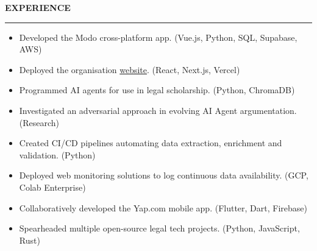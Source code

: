\documentclass[11pt, letterpaper]{article}
\newcommand\sectionTitle[1]{%
    \begingroup
        \textbf{\MakeUppercase{#1}}
        \vspace{0.4em}
        \hrule
        \vspace{-0.3em}
    \endgroup
}%
\newenvironment{experienceSection}[1]{%
    \sectionTitle{#1}%
    \begin{list}{}{ %
        \setlength{\leftmargin}{0em} %
    }%
        \item[]%
    }{%
    \end{list}%
}%
\begin{document}
\begin{experienceSection}{Experience}

    \experienceItem[
        company={The Modo Collective},
        location={Singapore},
        position={Founder \& Lead Developer},
        duration={Jan. 2025 - Aug. 2025}
    ]
    \begin{itemize}
        \setlength{\itemsep}{-6pt}
        \item Developed the Modo cross-platform app. (Vue.js, Python, SQL, Supabase, AWS)
        \item Deployed the organisation \href{https://modo-com.vercel.app/}{website}. (React, Next.js, Vercel)
    \end{itemize}

    \experienceItem[
        company={SMU Yong Pung How School of Law},
        location={Singapore},
        position={Research Assistant},
        duration={Jan. 2025 - Apr. 2025}
    ]
    \begin{itemize}
        \setlength{\itemsep}{-6pt}
        \item Programmed AI agents for use in legal scholarship. (Python, ChromaDB)
        \item Investigated an adversarial approach in evolving AI Agent argumentation. (Research)
    \end{itemize}

    \experienceItem[
        company={Elefant},
        location={Singapore},
        position={Backend Development Intern},
        duration={Sep. 2024 - Dec. 2024}
    ]
    \begin{itemize}
        \setlength{\itemsep}{-6pt}
        \item Created CI/CD pipelines automating data extraction, enrichment and validation. (Python)
        \item Deployed web monitoring solutions to log continuous data availability. (GCP, Colab Enterprise)
    \end{itemize}

    \experienceItem[
        company={The Yap Labs},
        location={Singapore},
        position={Co-founder \& Tech Development Head},
        duration={Apr. 2024 - Aug. 2024}
    ]
    \begin{itemize}
        \setlength{\itemsep}{-6pt}
        \item Collaboratively developed the Yap.com mobile app. (Flutter, Dart, Firebase)
    \end{itemize}

    \experienceItem[
        company={SMU Legal Innovation and Technology (LIT)},
        location={Singapore},
        position={Tech Development Director},
        duration={Aug. 2023 - Aug. 2024}
    ]
    \begin{itemize}
        \setlength{\itemsep}{-6pt}
        \item Spearheaded multiple open-source legal tech projects. (Python, JavaScript, Rust)
    \end{itemize}

\end{experienceSection}
\end{document}
